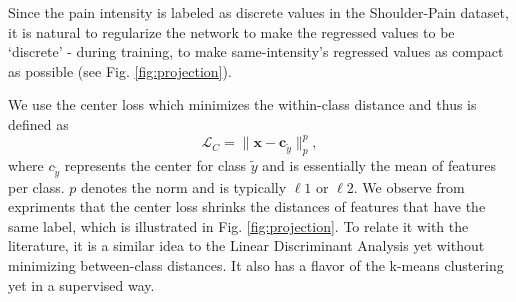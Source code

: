 \documentclass{article}
\begin{document}
Since the pain intensity is labeled as discrete values in the Shoulder-Pain dataset, it is natural to regularize the network to make the regressed values to be `discrete' - during training, to make same-intensity's regressed values as compact as possible (see Fig. \ref{fig:projection}).

We use the center loss \cite{wen2016discriminative} which minimizes the within-class distance and thus is defined as
\begin{equation}
\mathcal{L}_C = \|\mathbf{x} - \mathbf{c}_{\tilde{y}}\|_p^p,
\label{centerloss}
\end{equation}
\noindent where $c_{\tilde{y}}$ represents the center for class $\tilde{y}$ and is essentially the mean of features per class.
$p$ denotes the norm and is typically $\ell 1$ or $\ell 2$. 
We observe from expriments that the center loss shrinks the distances of features that have the same label,
which is illustrated in Fig. \ref{fig:projection}.
To relate it with the literature, it is a similar idea to the Linear Discriminant Analysis yet without minimizing between-class distances. It also has a flavor of the k-means clustering yet in a supervised way. 
\end{document}
